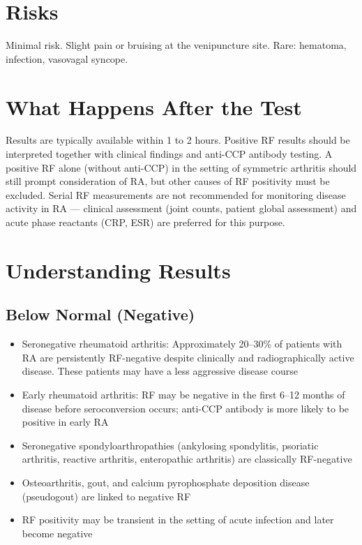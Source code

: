 \section*{Risks}
Minimal risk. Slight pain or bruising at the venipuncture site. Rare: hematoma, infection, vasovagal syncope.

\section*{What Happens After the Test}
Results are typically available within 1 to 2 hours. Positive RF results should be interpreted together with clinical findings and anti-CCP antibody testing. A positive RF alone (without anti-CCP) in the setting of symmetric arthritis should still prompt consideration of RA, but other causes of RF positivity must be excluded. Serial RF measurements are not recommended for monitoring disease activity in RA --- clinical assessment (joint counts, patient global assessment) and acute phase reactants (CRP, ESR) are preferred for this purpose.

\section*{Understanding Results}

\subsection*{Below Normal (Negative)}
\begin{itemize}
  \item Seronegative rheumatoid arthritis: Approximately 20--30\% of patients with RA are persistently RF-negative despite clinically and radiographically active disease. These patients may have a less aggressive disease course
  \item Early rheumatoid arthritis: RF may be negative in the first 6--12 months of disease before seroconversion occurs; anti-CCP antibody is more likely to be positive in early RA
  \item Seronegative spondyloarthropathies (ankylosing spondylitis, psoriatic arthritis, reactive arthritis, enteropathic arthritis) are classically RF-negative
  \item Osteoarthritis, gout, and calcium pyrophosphate deposition disease (pseudogout) are linked to negative RF
  \item RF positivity may be transient in the setting of acute infection and later become negative
\end{itemize}

